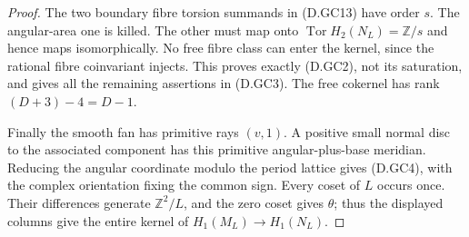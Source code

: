 \begin{proof}
The two boundary fibre torsion summands in
(D.GC13) have order $s$. The angular-area
one is killed. The other must map onto
$\operatorname{Tor}H_2(N_L)=\mathbb Z/s$ and
hence maps isomorphically. No free fibre
class can enter the kernel, since the rational
fibre coinvariant injects. This proves exactly
(D.GC2), not its saturation, and gives all
the remaining assertions in (D.GC3).
The free cokernel has rank $(D+3)-4=D-1$.

Finally the smooth fan has primitive rays
$(v,1)$. A positive small normal disc to
the associated component has this primitive
angular-plus-base meridian. Reducing the
angular coordinate modulo the period lattice
gives (D.GC4), with the complex orientation
fixing the common sign. Every coset of $L$
occurs once. Their differences generate
$\mathbb Z^2/L$, and the zero coset gives
$\theta$; thus the displayed columns give
the entire kernel of $H_1(M_L)\to H_1(N_L)$.
\end{proof}
